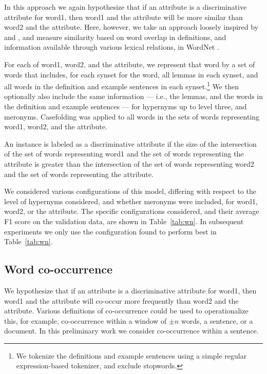 \documentclass[11pt,a4paper]{article}
\newcommand{\tabref}[1]{Table~\ref{#1}}
\begin{document}
In this approach we again hypothesize that if an attribute is a
discriminative attribute for word1, then word1 and the attribute will
be more similar than word2 and the attribute. Here, however, we take
an approach loosely inspired by \cite{Lesk:1986} and
\citep{Banerjee:Pedersen:2002}, and measure similarity based on word
overlap in definitions, and information available through various
lexical relations, in WordNet \citep{Fellbaum1998}.

For each of word1, word2, and the attribute, we represent that word by
a set of words that includes, for each synset for the word, all lemmas
in each synset, and all words in the definition and example sentences
in each synset.\footnote{We tokenize the definitions and example
  sentences using a simple regular expression-based tokenizer, and
  exclude stopwords.} We then optionally also include the same
information --- i.e., the lemmas, and the words in the definition and
example sentences --- for hypernyms up to level three, and
meronyms. Casefolding was applied to all words in the sets of words
representing word1, word2, and the attribute.

An instance is labeled as a discriminative attribute if the size of
the intersection of the set of words representing word1 and the set of
words representing the attribute is greater than the intersection of
the set of words representing word2 and the set of words representing
the attribute.

We considered various configurations of this model, differing with
respect to the level of hypernyms considered, and whether meronyms
were included, for word1, word2, or the attribute. The specific
configurations considered, and their average F1 score on the
validation data, are shown in \tabref{tab:wn}. In subsequent
experiments we only use the configuration found to perform best in
\tabref{tab:wn}.


\subsection{Word co-occurrence\label{sec:cooccurrence}}

We hypothesize that if an attribute is a discriminative attribute for
word1, then word1 and the attribute will co-occur more frequently than
word2 and the attribute. Various definitions of co-occurrence could be
used to operationalize this, for example, co-occurrence within a
window of $\pm n$ words, a sentence, or a document. In this
preliminary work we consider co-occurrence within a sentence.
\end{document}
